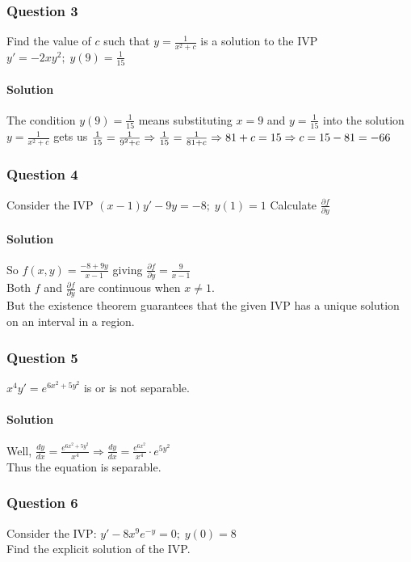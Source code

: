 \documentclass{article}
\begin{document}
\subsubsection{Question 3}
Find the value of $c$ such that $y=\frac{1}{x^2+c}$ is a solution to the IVP $y'=-2xy^2;\;y(9)=\frac{1}{15}$

\paragraph{Solution} The condition $y(9)=\frac{1}{15}$ means substituting $x=9$ and $y=\frac{1}{15}$
into the solution $y=\frac{1}{x^2+c}$ gets us $\frac{1}{15}=\frac{1}{9^2+c}\Rightarrow\frac{1}{15}=\frac{1}{81+c}
\\\Rightarrow81+c=15\Rightarrow c=15-81=-66$

\subsubsection{Question 4}
Consider the IVP $(x-1)y'-9y=-8;\;y(1)=1$ Calculate $\frac{\partial f}{\partial y}$

\paragraph{Solution} So $f(x,y)=\frac{-8+9y}{x-1}$ giving $\frac{\partial f}{\partial y}=\frac{9}{x-1}$
\\Both $f$ and $\frac{\partial f}{\partial y}$ are continuous when $x\neq1$.
\\But the existence theorem guarantees that the given IVP has a unique solution on an interval in a region.

\subsubsection{Question 5}
$x^4y'=e^{6x^2+5y^2}$ is or is not separable.

\paragraph{Solution} Well, $\frac{dy}{dx}=\frac{e^{6x^2+5y^2}}{x^4}\Rightarrow \frac{dy}{dx}=\frac{e^{6x^2}}{x^4}\cdot e^{5y^2}$
\\Thus the equation is separable.

\subsubsection{Question 6}
Consider the IVP: $y'-8x^9e^{-y}=0;\;y(0)=8$
\\Find the explicit solution of the IVP.
\end{document}

